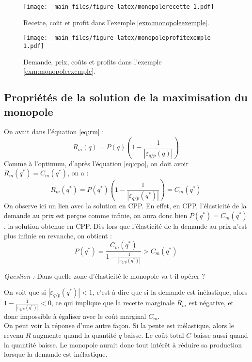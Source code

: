 \documentclass[
]{book}
\theoremstyle{definition}
\theoremstyle{definition}
\theoremstyle{definition}
\theoremstyle{definition}
\theoremstyle{remark}
\begin{document}
\begin{figure}
\centering
\texttt{[image: \_main\_files/figure-latex/monopolerecette-1.pdf]}
\caption{\label{fig:monopolerecette}Recette, coût et profit dans l'exemple \ref{exm:monopoleexemple}.}
\end{figure}

\begin{figure}
\centering
\texttt{[image: \_main\_files/figure-latex/monopoleprofitexemple-1.pdf]}
\caption{\label{fig:monopoleprofitexemple}Demande, prix, coûts et profits dans l'exemple \ref{exm:monopoleexemple}.}
\end{figure}

\hypertarget{propriuxe9tuxe9s-de-la-solution-de-la-maximisation-du-monopole}{%
\subsection{Propriétés de la solution de la maximisation du monopole}\label{propriuxe9tuxe9s-de-la-solution-de-la-maximisation-du-monopole}}

On avait dans l'équation \eqref{eq:rm} :
\[
R_m(q) = P(q)\left(1 - \frac{1}{|\varepsilon_{q/p}(q)|}\right)
\]
Comme à l'optimum, d'après l'équation \eqref{eq:cpo}, on doit avoir \(R_m(q^*)=C_m(q^*)\), on a :
\[
R_m(q^*) = P(q^*)\left(1 - \frac{1}{|\varepsilon_{q/p}(q^*)|}\right) = C_m(q^*) 
\label{eq:rmcm}
\]
On observe ici un lien avec la solution en CPP.
En effet, en CPP, l'élasticité de la demande au prix est perçue comme infinie, on aura donc bien \(P(q^*) = C_m(q^*)\), la solution obtenue en CPP.
Dès lors que l'élasticité de la demande au prix n'est plus infinie en revanche, on obtient :
\[
 P(q^*)=\frac{C_m(q^*)}{1 - \frac{1}{\left|\varepsilon_{q/p}(q^*)\right|}} > C_m(q^*)
\]

\emph{Question :} Dans quelle zone d'élasticité le monopole va-t-il opérer ?

On voit que si \(\left|\varepsilon_{q/p}(q^*)\right|<1\), c'est-à-dire que si la demande est inélastique, alors \(1 - \frac{1}{\left|\varepsilon_{q/p}(q^*)\right|} <0\), ce qui implique que la recette marginale \(R_m\) est négative, et donc impossible à égaliser avec le coût marginal \(C_m\).\\
On peut voir la réponse d'une autre façon.
Si la pente est inélastique, alors le revenu \(R\) augmente quand la quantité \(q\) baisse.
Le coût total \(C\) baisse aussi quand la quantité baisse.
Le monopole aurait donc tout intérêt à réduire sa production lorsque la demande est inélastique.
\end{document}
